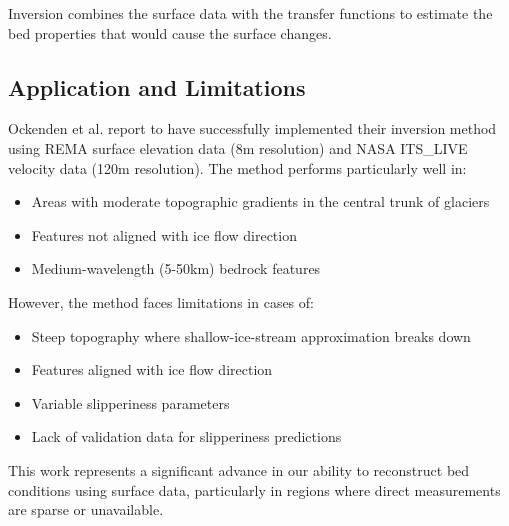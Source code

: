 Inversion combines the surface data with the transfer functions to estimate the bed properties that would cause the surface changes.

\subsection*{Application and Limitations}

Ockenden et al. report to have successfully implemented their inversion method using REMA surface elevation data (8m resolution) and NASA ITS\_LIVE velocity data (120m resolution). The method performs particularly well in:
\begin{itemize}
\item Areas with moderate topographic gradients in the central trunk of glaciers
\item Features not aligned with ice flow direction
\item Medium-wavelength (5-50km) bedrock features
\end{itemize}
However, the method faces limitations in cases of:
\begin{itemize}
\item Steep topography where shallow-ice-stream approximation breaks down
\item Features aligned with ice flow direction
\item Variable slipperiness parameters
\item Lack of validation data for slipperiness predictions
\end{itemize}
This work represents a significant advance in our ability to reconstruct bed conditions using surface data, particularly in regions where direct measurements are sparse or unavailable.


